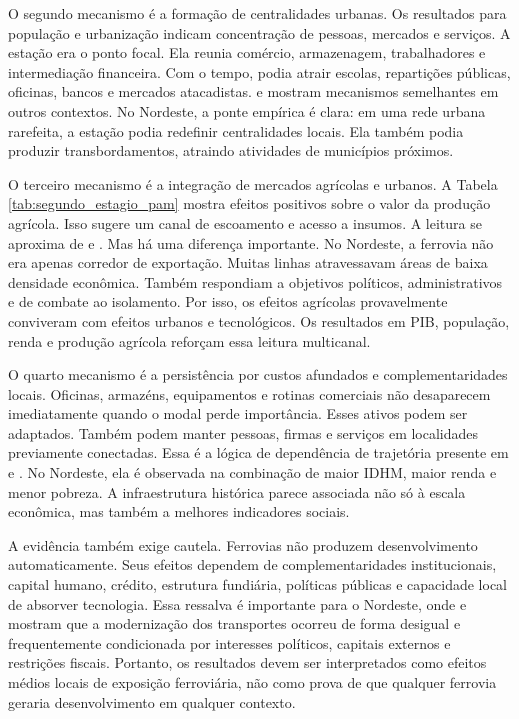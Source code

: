 \documentclass[12pt,a4paper]{article}
\begin{document}
O segundo mecanismo é a formação de centralidades urbanas. Os resultados para população e urbanização indicam concentração de pessoas, mercados e serviços. A estação era o ponto focal. Ela reunia comércio, armazenagem, trabalhadores e intermediação financeira. Com o tempo, podia atrair escolas, repartições públicas, oficinas, bancos e mercados atacadistas. \citet{berger2017} e \citet{jedwab2016} mostram mecanismos semelhantes em outros contextos. No Nordeste, a ponte empírica é clara: em uma rede urbana rarefeita, a estação podia redefinir centralidades locais. Ela também podia produzir transbordamentos, atraindo atividades de municípios próximos.

O terceiro mecanismo é a integração de mercados agrícolas e urbanos. A Tabela \ref{tab:segundo_estagio_pam} mostra efeitos positivos sobre o valor da produção agrícola. Isso sugere um canal de escoamento e acesso a insumos. A leitura se aproxima de \citet{fogel1964} e \citet{summerhill2005}. Mas há uma diferença importante. No Nordeste, a ferrovia não era apenas corredor de exportação. Muitas linhas atravessavam áreas de baixa densidade econômica. Também respondiam a objetivos políticos, administrativos e de combate ao isolamento. Por isso, os efeitos agrícolas provavelmente conviveram com efeitos urbanos e tecnológicos. Os resultados em PIB, população, renda e produção agrícola reforçam essa leitura multicanal.

O quarto mecanismo é a persistência por custos afundados e complementaridades locais. Oficinas, armazéns, equipamentos e rotinas comerciais não desaparecem imediatamente quando o modal perde importância. Esses ativos podem ser adaptados. Também podem manter pessoas, firmas e serviços em localidades previamente conectadas. Essa é a lógica de dependência de trajetória presente em \citet{donaldsonhornbeck2016} e \citet{donaldson2018}. No Nordeste, ela é observada na combinação de maior IDHM, maior renda e menor pobreza. A infraestrutura histórica parece associada não só à escala econômica, mas também a melhores indicadores sociais.

A evidência também exige cautela. Ferrovias não produzem desenvolvimento automaticamente. Seus efeitos dependem de complementaridades institucionais, capital humano, crédito, estrutura fundiária, políticas públicas e capacidade local de absorver tecnologia. Essa ressalva é importante para o Nordeste, onde \citet{graham1968} e \citet{summerhill2003} mostram que a modernização dos transportes ocorreu de forma desigual e frequentemente condicionada por interesses políticos, capitais externos e restrições fiscais. Portanto, os resultados devem ser interpretados como efeitos médios locais de exposição ferroviária, não como prova de que qualquer ferrovia geraria desenvolvimento em qualquer contexto.
\end{document}
